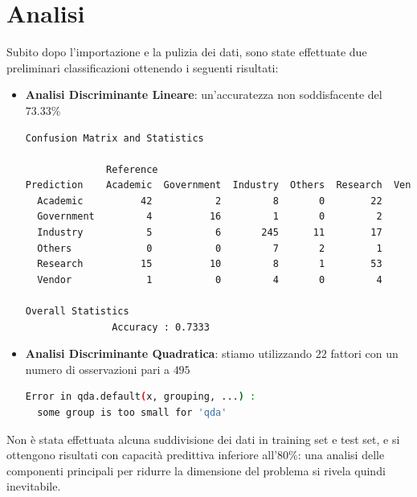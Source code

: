 \documentclass[11pt,a4paper]{article}
\begin{document}
\section{Analisi}
Subito dopo l'importazione e la pulizia dei dati, sono state effettuate due
preliminari classificazioni ottenendo i seguenti risultati:
\begin{itemize}
	\item \textbf{Analisi Discriminante Lineare}: un'accuratezza non
		soddisfacente del $73.33\%$
	\begin{lstlisting}[language=bash,basicstyle=\scriptsize,tabsize=2,frame = single]
Confusion Matrix and Statistics

              Reference
Prediction    Academic  Government  Industry  Others  Research  Vendor
  Academic          42           2         8       0        22       2
  Government         4          16         1       0         2       0
  Industry           5           6       245      11        17       0
  Others             0           0         7       2         1       0
  Research          15          10         8       1        53       1
  Vendor             1           0         4       0         4       5

Overall Statistics
               Accuracy : 0.7333
	\end{lstlisting}
	\item \textbf{Analisi Discriminante Quadratica}: stiamo utilizzando $22$
		fattori con un numero di osservazioni pari a $495$
	\begin{lstlisting}[language=bash,basicstyle=\scriptsize,tabsize=2,frame = single]
Error in qda.default(x, grouping, ...) : 
  some group is too small for 'qda'
	\end{lstlisting}
\end{itemize}
Non \`e stata effettuata alcuna suddivisione dei dati in training set e test
set, e si ottengono risultati con capacit\`a predittiva inferiore all'$80\%$:
una analisi delle componenti principali per ridurre la dimensione del problema
si rivela quindi inevitabile.
\end{document}
